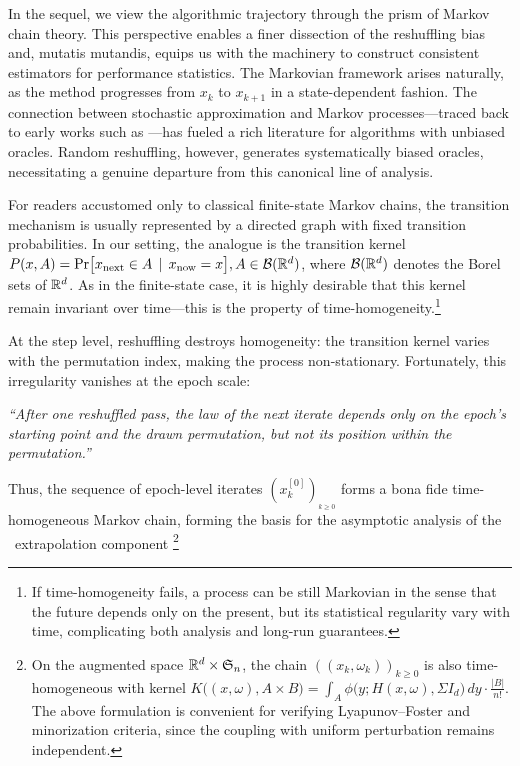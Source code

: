 In the sequel, we view the algorithmic trajectory through the prism of Markov chain theory. This perspective enables a finer dissection of the reshuffling bias and, mutatis mutandis, equips us with the machinery to construct consistent estimators for performance statistics. The Markovian framework arises naturally, as the method progresses from $x_k$ to $x_{k+1}$ in a state-dependent fashion. The connection between stochastic approximation and Markov processes—traced back to early works such as \cite{robbins1951stochastic,pflug1986stochastic}—has fueled a rich literature for algorithms with unbiased oracles. Random reshuffling, however, generates systematically biased oracles, necessitating a genuine departure from this canonical line of analysis.

For readers accustomed only to classical finite-state Markov chains, the transition mechanism is usually represented by a directed graph with fixed transition probabilities.
In our setting, the analogue is the transition kernel
$P(x,A)=\Pr\!\big[x_{\text{next}}\in A \,\mid\, x_{\text{now}}=x\big], A\in\mathcal{B}(\mathbb{R}^d)$,
where $\mathcal{B}(\mathbb{R}^d)$ denotes the Borel sets of $\mathbb{R}^d$.
As in the finite-state case, it is highly desirable that this kernel remain invariant over time—this is the property of time-homogeneity.\footnote{If time-homogeneity fails, a process can be still Markovian in the sense that the future depends only on the present, but its statistical regularity vary with time, complicating both analysis and long-run guarantees.}

At the step level, reshuffling destroys homogeneity: the transition kernel varies with the permutation index, making the process non-stationary.
Fortunately, this irregularity vanishes at the epoch scale:\begin{center}
\emph{``After one reshuffled pass, the law of the next iterate depends only on the epoch’s starting point and the drawn permutation, but not its position within the permutation.''}\end{center}\vspace{-0.5em}
Thus, the sequence of epoch-level iterates $(x^{[0]}_{{k}})_{_{{k}\ge0}}$ forms a bona fide time-homogeneous Markov chain,  forming the basis for the asymptotic analysis of the \RRrom\ extrapolation component \footnote{On the augmented space $\mathbb{R}^d\times\mathfrak{S}_n$, the chain $((x_k,\omega_k))_{k\ge0}$ is also time-homogeneous with kernel
\(
K\big((x,\omega),A\times B\big)
=\int_A \phi\big(y;H(x,\omega),\Sigma I_d\big)\,dy\cdot \frac{|B|}{n!}.
\)
The above formulation is convenient for verifying Lyapunov–Foster and minorization criteria, since the coupling with uniform perturbation remains independent.}

